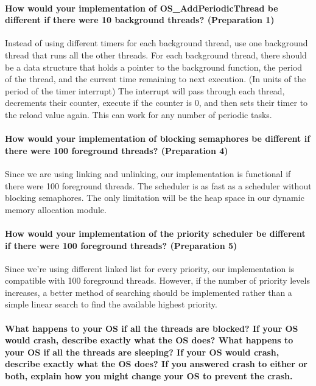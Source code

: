 \documentclass[a4paper]{article}
\begin{document}
\paragraph{How would your implementation of OS\_AddPeriodicThread be different if there were 10 background
threads? (Preparation 1)\\}

Instead of using different timers for each background thread, use one background thread that runs all the other threads. For each background thread, there should be a data structure that holds a pointer to the background function, the period of the thread, and the current time remaining to next execution. (In units of the period of the
timer interrupt) The interrupt will pass through each thread, decrements their counter, execute if the counter is 0, and then sets their timer to the reload value again. This can work for any number of periodic tasks.
 
\paragraph{How would your implementation of blocking semaphores be different if there were 100 foreground threads?
(Preparation 4) \\}

Since we are using linking and unlinking, our implementation is functional if there were 100 foreground threads.
The scheduler is as fast as a scheduler without blocking semaphores. The only limitation will be the heap space
in our dynamic memory allocation module.
 
\paragraph{How would your implementation of the priority scheduler be different if there were 100 foreground
threads?  (Preparation 5) \\}

Since we're using different linked list for every priority, our implementation is compatible with 100 foreground threads. However, if the number of  priority levels increases, a better method of searching should be implemented rather than a simple linear search to find the available highest priority.
 
\paragraph{What happens to your OS if all the threads are blocked? If your OS would crash, describe exactly what the 
OS does? What happens to your OS if all the threads are sleeping? If your OS would crash, describe exactly 
what the OS does? If you answered crash to either or both, explain how you might change your OS to prevent 
the crash. \\}
\end{document}
